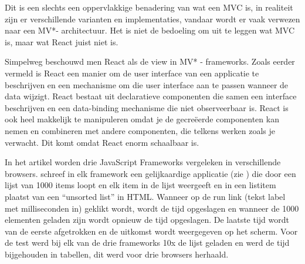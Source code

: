 	Dit is een slechts een oppervlakkige benadering van wat een MVC is, in realiteit zijn er verschillende varianten en implementaties, vandaar wordt er vaak verwezen naar een MV*- architectuur. Het is niet de bedoeling om uit te leggen wat MVC is, maar wat React juist niet is.
	
	Simpelweg beschouwd men React als de view in MV* - frameworks. Zoals eerder vermeld is React een manier om de user interface van een applicatie te beschrijven en een mechanisme om die user interface aan te passen wanneer de data wijzigt. React bestaat uit declaratieve componenten die samen een interface beschrijven en een data-binding mechanisme die niet observeerbaar is. React is ook heel makkelijk te manipuleren omdat je de gecreëerde componenten kan nemen en combineren met andere componenten, die telkens werken zoals je verwacht. Dit komt omdat React enorm schaalbaar is.
	
	In het artikel \cite{Harrington:React} worden drie JavaScript Frameworks vergeleken in verschillende browsers. \citeauthor{Harrington:React} schreef in elk framework een gelijkaardige applicatie (zie ) die door een lijst van 1000 items loopt en elk item in de lijst weergeeft en in een listitem plaatst van een ``unsorted list'' in HTML. Wanneer op de run link (tekst label met milliseconden in) geklikt wordt, wordt de tijd opgeslagen en wanneer de 1000 elementen geladen zijn wordt opnieuw de tijd opgeslagen. De laatste tijd wordt van de eerste afgetrokken en de uitkomst wordt weergegeven op het scherm. Voor de test werd bij elk van de drie frameworks 10x de lijst geladen en werd de tijd bijgehouden in tabellen, dit werd voor drie browsers herhaald.
	

